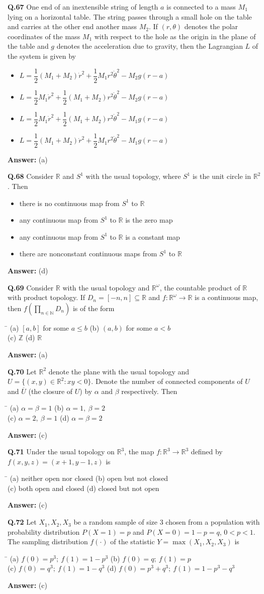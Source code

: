 \documentclass[11pt,a4paper]{article}
\newcommand{\optsfour}[4]{%
  \begin{tabbing}
    \hspace{0.48\linewidth}\=\kill
    (a) #1 \> (b) #2 \\[2pt]
    (c) #3 \> (d) #4
  \end{tabbing}%
}
\newcommand{\optslist}[4]{%
  \begin{itemize}
    \setlength{\itemsep}{2pt}\setlength{\parskip}{0pt}
    \item[(a)] #1
    \item[(b)] #2
    \item[(c)] #3
    \item[(d)] #4
  \end{itemize}%
}
\newcommand{\ans}[1]{\textbf{Answer:} #1\par\medskip}
\begin{document}
\textbf{Q.67} One end of an inextensible string of length $a$ is connected to a mass $M_1$ lying on a horizontal table. The string passes through a small hole on the table and carries at the other end another mass $M_2$. If $(r, \theta)$ denotes the polar coordinates of the mass $M_1$ with respect to the hole as the origin in the plane of the table and $g$ denotes the acceleration due to gravity, then the Lagrangian $L$ of the system is given by
\optslist{$L = \dfrac{1}{2}(M_1 + M_2)\dot{r}^2 + \dfrac{1}{2}M_1 r^2 \dot{\theta}^2 - M_2 g(r - a)$}{$L = \dfrac{1}{2}M_1 \dot{r}^2 + \dfrac{1}{2}(M_1 + M_2)r^2 \dot{\theta}^2 - M_2 g(r - a)$}{$L = \dfrac{1}{2}M_1 \dot{r}^2 + \dfrac{1}{2}(M_1 + M_2)r^2 \dot{\theta}^2 - M_1 g(r - a)$}{$L = \dfrac{1}{2}(M_1 + M_2)\dot{r}^2 + \dfrac{1}{2}M_1 r^2 \dot{\theta}^2 - M_1 g(r - a)$}
\ans{(a)}

\textbf{Q.68} Consider $\mathbb{R}$ and $S^1$ with the usual topology, where $S^1$ is the unit circle in $\mathbb{R}^2$. Then
\optslist{there is no continuous map from $S^1$ to $\mathbb{R}$}{any continuous map from $S^1$ to $\mathbb{R}$ is the zero map}{any continuous map from $S^1$ to $\mathbb{R}$ is a constant map}{there are nonconstant continuous maps from $S^1$ to $\mathbb{R}$}
\ans{(d)}

\textbf{Q.69} Consider $\mathbb{R}$ with the usual topology and $\mathbb{R}^\omega$, the countable product of $\mathbb{R}$ with product topology. If $D_n = [-n, n] \subseteq \mathbb{R}$ and $f : \mathbb{R}^\omega \to \mathbb{R}$ is a continuous map, then $f\!\left(\displaystyle\prod_{n \in \mathbb{N}} D_n\right)$ is of the form
\optsfour{$[a, b]$ for some $a \le b$}{$(a, b)$ for some $a < b$}{$\mathbb{Z}$}{$\mathbb{R}$}
\ans{(a)}

\textbf{Q.70} Let $\mathbb{R}^2$ denote the plane with the usual topology and $U = \{(x,y) \in \mathbb{R}^2 : xy < 0\}$. Denote the number of connected components of $U$ and $\overline{U}$ (the closure of $U$) by $\alpha$ and $\beta$ respectively. Then
\optsfour{$\alpha = \beta = 1$}{$\alpha = 1,\ \beta = 2$}{$\alpha = 2,\ \beta = 1$}{$\alpha = \beta = 2$}
\ans{(c)}

\textbf{Q.71} Under the usual topology on $\mathbb{R}^3$, the map $f : \mathbb{R}^3 \to \mathbb{R}^3$ defined by $f(x,y,z) = (x+1, y-1, z)$ is
\optsfour{neither open nor closed}{open but not closed}{both open and closed}{closed but not open}
\ans{(c)}

\textbf{Q.72} Let $X_1, X_2, X_3$ be a random sample of size $3$ chosen from a population with probability distribution $P(X = 1) = p$ and $P(X = 0) = 1 - p = q$, $0 < p < 1$. The sampling distribution $f(\cdot)$ of the statistic $Y = \max(X_1, X_2, X_3)$ is
\optsfour{$f(0) = p^3;\ f(1) = 1 - p^3$}{$f(0) = q;\ f(1) = p$}{$f(0) = q^3;\ f(1) = 1 - q^3$}{$f(0) = p^3 + q^3;\ f(1) = 1 - p^3 - q^3$}
\ans{(c)}
\end{document}
